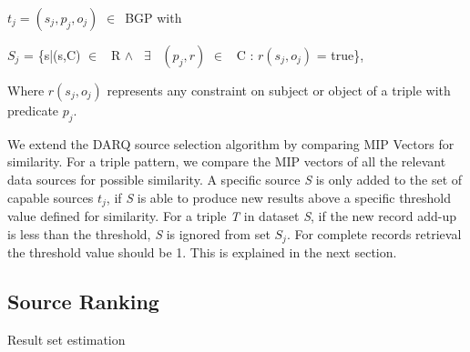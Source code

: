 \documentclass{sig-alternate}  %
\begin{document}
\begin{center}
$t_j = (s_j, p_j, o_j)$ $\in$\ BGP with 
\par\end{center}

\begin{center}
$S_j$ = \{s|(s,C) $\in$ \ R $\wedge$ \ $\exists$
\ $(p_j, r)$ $\in$ \ C : $r(s_j, o_j)$ = true\}, 
\par\end{center}
\begin{flushleft}
Where $r(s_j, o_j)$ represents any constraint
on subject or object of a triple with predicate $p_j$.
\par\end{flushleft}

We extend the DARQ source selection algorithm by comparing MIP Vectors
 for similarity. For a triple pattern, we compare the MIP
vectors of all the relevant data sources for possible similarity.
A specific source \emph{S} is only added to the set of capable sources $t_j$,
if \emph{S} is able to produce new results above a specific threshold value
defined for similarity. For a triple \emph{T} in dataset \emph{S}, if the new record add-up
is less than the threshold, \emph{S} is ignored from set $S_j$. For complete records retrieval the threshold value should be 1. This is explained in the next section.

\subsection{Source Ranking}
Result set estimation       
\end{document}
